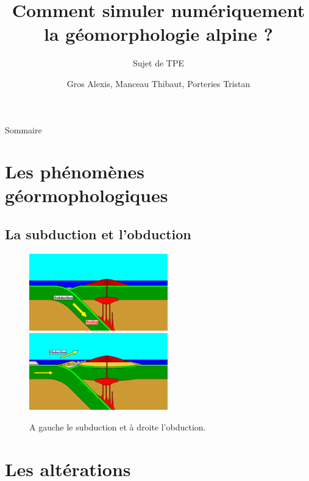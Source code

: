 \documentclass{beamer}
\title{Comment simuler numériquement la géomorphologie alpine ?}
\subtitle{Sujet de TPE}
\author{Gros Alexis, Manceau Thibaut, Porteries Tristan}
\begin{document}
\frame{\titlepage}

\begin{frame}{Sommaire}
  \begin{multicols}{2}
    \small \tableofcontents
  \end{multicols}
\end{frame}

\section{Les phénomènes géormophologiques}
\subsection{La subduction et l'obduction}
\begin{frame}
  \begin{figure}
    \begin{center}
      \includegraphics[width=6cm]{Images/subduction.png}
      \includegraphics[width=6cm]{Images/obduction.png}
      \caption{A gauche le subduction et à droite l'obduction.}
    \end{center}
  \end{figure}
\end{frame}

\section{Les altérations}
\end{document}
